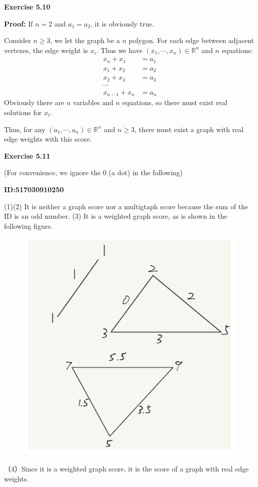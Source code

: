 \documentclass{article} %
\begin{document}
\textbf{Exercise 5.10}\par
	\textbf{Proof:}
	If $n=2$ and $a_1=a_2$, it is obviously true.\par
	Consider $n\ge 3$, we let the graph be a $n$ polygon. For each edge between adjacent vertexes, the edge weight is $x_i$. 
	Thus we have $(x_1,\cdots, x_n)\in\mathbb{R}^n$ and  $n$ equations:
	\begin{align*}
	x_{n}+x_1&=a_1\\
	x_1+x_2&=a_2\\
	x_2+x_3&=a_3\\
	\cdots\\
	x_{n-1}+x_{n}&=a_{n}
	\end{align*}
	Obviously there are $n$ variables and $n$ equations, so there must exist real solutions for $x_i$.\par
	Thus, for any $(a_1,\cdots, a_n)\in\mathbb{R}^n$ and $n\ge 3$, there must exist a graph with real edge weights with this score.



	\textbf{Exercise 5.11}\par
	(For convenience, we ignore the 0 (a dot) in the following)\par
	\textbf{ID:517030910250}\par
	(1)(2) It is neither a graph score nor a multigtaph score because the sum of the ID is an odd number.
	(3) It is a weighted graph score, as is shown in the following figure.
	
	\begin{figure}[H]
		\centering
		\includegraphics[scale=0.6]{10250.png}
		\caption{}
		\label{fig:1}
	\end{figure}
	（4）Since it is a weighted graph score, it is the score of a graph with real edge weights.
\end{document}
